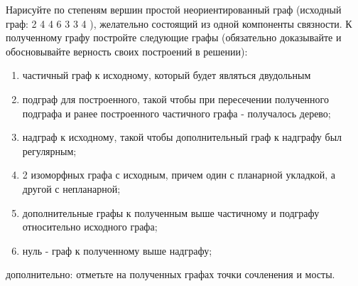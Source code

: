 \question
Нарисуйте по степеням вершин простой неориентированный граф (исходный граф: 2 4 4 6 3 3 4 ), желательно состоящий из одной компоненты связности. 
К полученному графу постройте следующие графы (обязательно доказывайте и  обосновывайте верность своих построений в решении):
\begin{enumerate}
\item   частичный граф к исходному, который будет являться двудольным
\item   подграф для построенного, такой чтобы при пересечении полученного подграфа и ранее построенного частичного графа - получалось дерево;
\item   надграф к исходному, такой чтобы  дополнительный граф к надграфу был  регулярным;
\item   2 изоморфных графа с исходным, причем один с планарной укладкой, а другой с непланарной;
\item   дополнительные графы к полученным выше частичному и подграфу относительно исходного графа;
\item   нуль - граф к полученному выше надграфу;
\end{enumerate}
дополнительно: отметьте на полученных графах точки сочленения и мосты.



